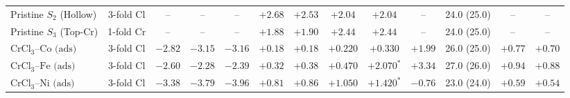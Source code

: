 \documentclass[journal=jacsat,manuscript=article]{achemso}
\begin{document}
{\begin{table}[htbp]
\begin{adjustbox}{max width=\textwidth}
\begin{tabular}{lcccccccccccc}
        Pristine $S_2$ (Hollow)          & 3-fold Cl       & --                                                               & --                                                                     & --                             & $+2.68$                       & $+2.53$                                                                   & $+2.04$                   & $+2.04$                    & --                 & 24.0 (25.0)        & --                        & --                         \\
        Pristine $S_3$ (Top-Cr)          & 1-fold Cr       & --                                                               & --                                                                     & --                             & $+1.88$                       & $+1.90$                                                                   & $+2.44$                   & $+2.44$                    & --                 & 24.0 (25.0)        & --                        & --                         \\
        \midrule
        $\text{CrCl}_3\text{--Co (ads)}$ & 3-fold Cl       & $-2.82$                                                          & $-3.15$                                                                & $-3.16$                        & $+0.18$                       & $+0.18$                                                                   & $\mathbf{+0.220}$         & $\mathbf{+0.330}$          & $+1.99$            & 26.0 (25.0)        & $+0.77$                   & $+0.70$                    \\
        $\text{CrCl}_3\text{--Fe (ads)}$ & 3-fold Cl       & $-2.60$                                                          & $-2.28$                                                                & $-2.39$                        & $\mathbf{+0.32}$              & $+0.38$                                                                   & $\mathbf{+0.470}$         & $+2.070^*$                 & $+3.34$            & 27.0 (26.0)        & $+0.94$                   & $+0.88$                    \\
        $\text{CrCl}_3\text{--Ni (ads)}$ & 3-fold Cl       & $-3.38$                                                          & $-3.79$                                                                & $-3.96$                        & $+0.81$                       & $+0.86$                                                                   & $+1.050$                  & $+1.420^*$                 & $-0.76$            & 23.0 (24.0)        & $+0.59$                   & $+0.54$                    \\

\end{tabular}
\end{adjustbox}
\end{table}}
\end{document}
